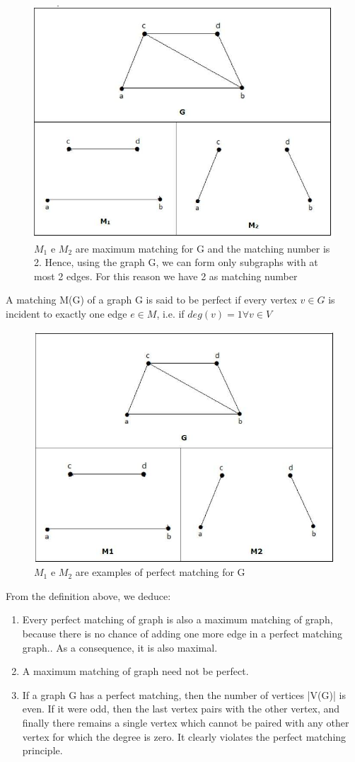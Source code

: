 \begin{figure}[htbp]
\centering
\includegraphics[width=.60\textwidth]{maximum.png}
\caption{$M_{1}$ e $M_{2}$ are maximum matching for G and the matching number is 2. Hence, using the graph G, we can form only subgraphs with at most 2 edges. For this reason we have 2 as matching number}
\end{figure}

\begin{definition}
A matching M(G) of a graph G is said to be perfect if every vertex $v \in G$ is incident to exactly one edge $e \in M$, i.e. if $deg(v) = 1 \forall v \in V$
\end{definition}

\begin{figure}[htbp]
\centering
\includegraphics[width=.60\textwidth]{perfect.png}
\caption{$M_{1}$ e $M_{2}$ are examples of perfect matching for G}
\end{figure}

\begin{observation}
From the definition above, we deduce:
\begin{enumerate}
\item Every perfect matching of graph is also a maximum matching of graph, because there is no chance of adding one more edge in a perfect matching graph.. As a consequence, it is also maximal.
\item A maximum matching of graph need not be perfect.
\item If a graph G has a perfect matching, then the number of vertices |V(G)| is even. If it were odd, then the last vertex pairs with the other vertex, and finally there remains a single vertex which cannot be paired with any other vertex for which the degree is zero. It clearly violates the perfect matching principle.
\end{enumerate}
\end{observation}

